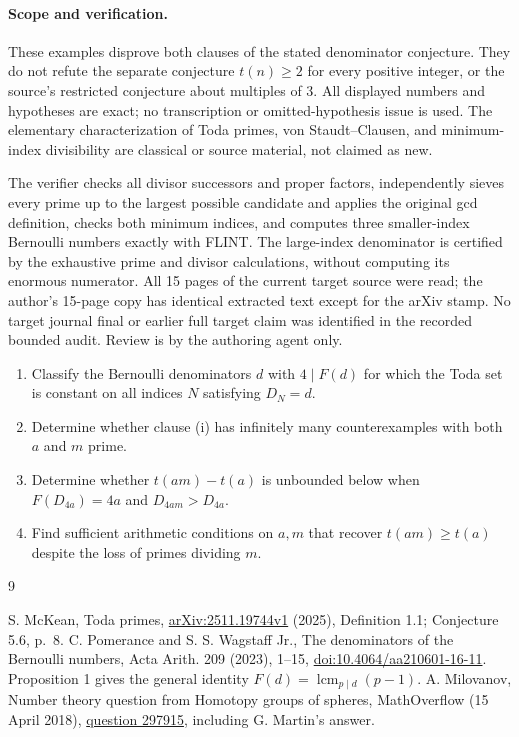 \documentclass[11pt]{article}
\begin{document}
\paragraph{Scope and verification.}
These examples disprove both clauses of the stated denominator
conjecture. They do not refute the separate conjecture $t(n)\geq2$
for every positive integer, or the source's restricted conjecture
about multiples of 3. All displayed numbers and hypotheses are exact;
no transcription or omitted-hypothesis issue is used.
The elementary characterization of Toda primes, von Staudt--Clausen,
and minimum-index divisibility are classical or source material,
not claimed as new.

The verifier checks all divisor successors and proper factors,
independently sieves every prime up to the largest possible candidate
and applies the original gcd definition, checks both minimum indices,
and computes three smaller-index Bernoulli numbers exactly with FLINT.
The large-index denominator is certified by the exhaustive prime
and divisor calculations, without computing its enormous numerator.
All 15 pages of the current target source were read; the author's
15-page copy has identical extracted text except for the arXiv stamp.
No target journal final or earlier full target claim was identified
in the recorded bounded audit. Review is by the authoring agent only.

\begin{enumerate}[label=\textbf{Task \arabic*:},start=2,leftmargin=*]
\item Classify the Bernoulli denominators $d$ with $4\mid F(d)$ for
which the Toda set is constant on all indices $N$ satisfying $D_N=d$.
\item Determine whether clause (i) has infinitely many counterexamples
with both $a$ and $m$ prime.
\item Determine whether $t(am)-t(a)$ is unbounded below when
$F(D_{4a})=4a$ and $D_{4am}>D_{4a}$.
\item Find sufficient arithmetic conditions on $a,m$ that recover
$t(am)\geq t(a)$ despite the loss of primes dividing $m$.
\end{enumerate}
\small
\begin{thebibliography}{9}
\raggedright
{} S. McKean, Toda primes,
\href{https://arxiv.org/abs/2511.19744}{arXiv:2511.19744v1} (2025),
Definition 1.1; Conjecture 5.6, p.~8.
 C. Pomerance and S. S. Wagstaff Jr.,
The denominators of the Bernoulli numbers,
Acta Arith. 209 (2023), 1--15,
\href{https://doi.org/10.4064/aa210601-16-11}{doi:10.4064/aa210601-16-11}.
Proposition 1 gives the general identity $F(d)=\operatorname{lcm}_{p\mid d}(p-1)$.
 A. Milovanov, Number theory question from Homotopy groups
of spheres, MathOverflow (15 April 2018),
\href{https://mathoverflow.net/q/297915}{question 297915},
including G. Martin's answer.
\end{thebibliography}
\end{document}
